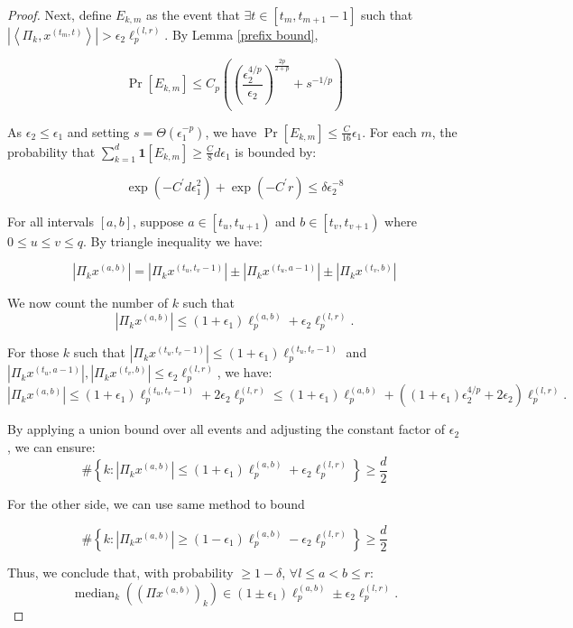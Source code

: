 \documentclass{article}
\DeclareMathOperator{\med}{median}
\theoremstyle{plain}
\begin{document}
\begin{proof}
Next, define $E_{k, m}$ as the event that $\exists t \in\left[t_m, t_{m+1}-1\right]$ such that $\left|\left\langle\Pi_k, x^{\left(t_m, t\right)}\right\rangle\right|>\epsilon_2 \ell_p^{\left(l, r\right)}$. By Lemma \ref{prefix bound},

$$
\operatorname{Pr}\left[E_{k, m}\right] \leq C_p\left(\left(\frac{\epsilon_2^{4 / p}}{\epsilon_2}\right)^{\frac{2 p}{2+p}}+s^{-1 / p}\right)
$$


As $\epsilon_2 \leq \epsilon_1$ and setting $s=\Theta\left(\epsilon_1^{-p}\right)$, we have $\operatorname{Pr}\left[E_{k, m}\right] \leq \frac{C}{16} \epsilon_1$.
For each $m$, the probability that $\sum_{k=1}^d \mathbf{1}\left[E_{k, m}\right] \geq \frac{C}{8} d \epsilon_1$ is bounded by:

$$
\exp \left(-C^{\prime} d \epsilon_1^2\right)+\exp \left(-C^{\prime} r\right) \leq \delta \epsilon_2^{-8}
$$


For all intervals $[a, b]$, suppose $a \in\left[t_u, t_{u+1}\right)$ and $b \in\left[t_v, t_{v+1}\right)$ where $0 \leq u \leq v \leq q$. By triangle inequality we have:

$$
|\Pi_kx ^ {(a, b)}|=|\Pi_k x ^ {(t_u, t_v-1)}| \pm|\Pi_k x ^ {(t_u, a-1)}| \pm|\Pi_k x ^ {(t_v, b)}|
$$

We now count the number of $k$ such that
\[
|\Pi_k x ^ {(a, b)}| \leq (1 + \epsilon_1) \ell_p^{(a, b)} + \epsilon_2 \ell_p^{(l, r)}.
\]

For those $k$ such that $|\Pi_k x ^ {(t_u, t_v-1)}|\leq (1 + \epsilon_1) \ell_p^{(t_u, t_v-1)}$ and $|\Pi_k x ^ {(t_u, a-1)}|, |\Pi_k x ^ {(t_v, b)}| \leq \epsilon_2 \ell_p^{(l, r)}$, we have:
\[
|\Pi_k x ^ {(a, b)}| \leq (1 + \epsilon_1) \ell_p^{(t_u, t_v-1)} + 2 \epsilon_2 \ell_p^{(l, r)} \leq (1 + \epsilon_1) \ell_p^{(a, b)} + \left( (1 + \epsilon_1) \epsilon_2^{4/p} + 2 \epsilon_2 \right) \ell_p^{(l, r)}.
\]

By applying a union bound over all events and adjusting the constant factor of $\epsilon_2$, we can ensure:
\[
\# \left\{ k : |\Pi_k x ^ {(a, b)}| \leq (1 + \epsilon_1) \ell_p^{(a, b)} + \epsilon_2 \ell_p^{(l, r)} \right\} \geq \frac{d}{2}
\]

For the other side, we can use same method to bound 

\[
\# \left\{ k : |\Pi_k x ^ {(a, b)}| \ge (1 - \epsilon_1) \ell_p^{(a, b)} - \epsilon_2 \ell_p^{(l, r)} \right\} \geq \frac{d}{2}
\]


Thus, we conclude that, with probability $\ge 1 - \delta$, $\forall l \le a < b \le r$:
\[
\med_k\left( (\Pi x^{(a,b)})_k \right) \in (1 \pm \epsilon_1) \ell_p^{(a,b)} \pm \epsilon_2 \ell_p^{(l,r)}.
\]

\end{proof}
\end{document}
